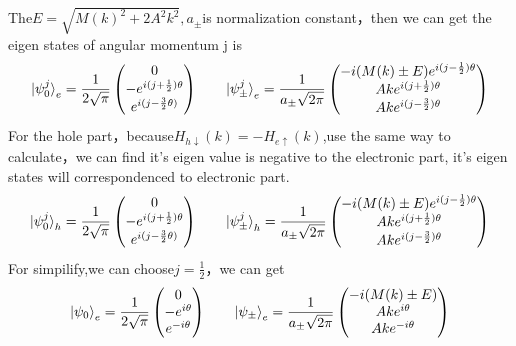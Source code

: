 \documentclass[4pt]{article}
\begin{document}
The$E=\sqrt{M(k)^2+2A^2k^2},a_{\pm}$is normalization constant，then we can get the eigen states of angular momentum j is
\begin{align}
	\ket{\psi_0^j}_e=\frac{1}{2\sqrt{\pi}}
	\begin{pmatrix}
		0\\
		-e^{i(j+\frac{1}{2})\theta}\\
		e^{i(j-\frac{3}{2}\theta)}
	\end{pmatrix}
\qquad
	\ket{\psi_{\pm}^j}_e=\frac{1}{a_{\pm}\sqrt{2\pi}}
	\begin{pmatrix}
		-i(M(k)\pm E)e^{i(j-\frac{1}{2})\theta}\\
		Ake^{i(j+\frac{1}{2})\theta}\\
		Ake^{i(j-\frac{3}{2})\theta}
	\end{pmatrix}
\end{align}
For the hole part，because$H_{h\downarrow}(k)=-H_{e\uparrow}(k)$,use the same way to calculate，we can find it's eigen value is negative to the electronic part, it's eigen states will correspondenced to electronic part.
\begin{align}
	\ket{\psi_0^j}_h=\frac{1}{2\sqrt{\pi}}
	\begin{pmatrix}
		0\\
		-e^{i(j+\frac{1}{2})\theta}\\
		e^{i(j-\frac{3}{2}\theta)}
	\end{pmatrix}
	\qquad
	\ket{\psi_{\pm}^j}_h=\frac{1}{a_{\pm}\sqrt{2\pi}}
	\begin{pmatrix}
		-i(M(k)\pm E)e^{i(j-\frac{1}{2})\theta}\\
		Ake^{i(j+\frac{1}{2})\theta}\\
		Ake^{i(j-\frac{3}{2})\theta}
	\end{pmatrix}
\end{align}
		For simpilify,we can choose$j=\frac{1}{2}$，we can get
\begin{align}
	\ket{\psi_0}_e=\frac{1}{2\sqrt{\pi}}
	\begin{pmatrix}
		0\\
		-e^{i\theta}\\
		e^{-i\theta}
	\end{pmatrix}
	\qquad
	\ket{\psi_{\pm}}_e=\frac{1}{a_{\pm}\sqrt{2\pi}}
	\begin{pmatrix}
		-i(M(k)\pm E)\\
		Ake^{i\theta}\\
		Ake^{-i\theta}
	\end{pmatrix}
\end{align}
\end{document}
